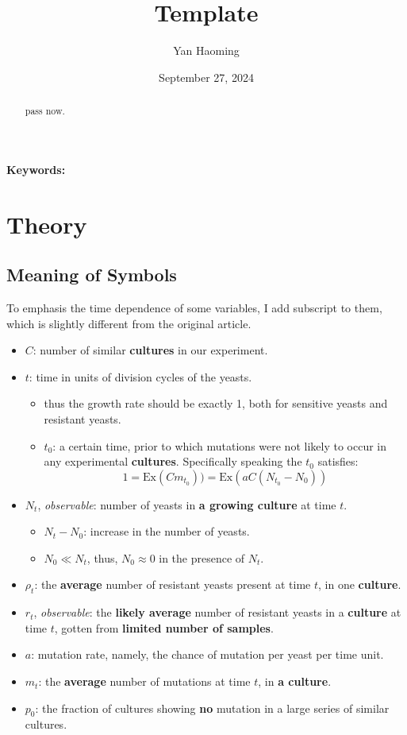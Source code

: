 \documentclass[UTF-8]{article}
\title{Template}
\author{Yan Haoming}
\date{September 27, 2024}
\begin{document}
\maketitle
\begin{abstract}
    pass now.
\end{abstract}
\textbf{Keywords: }
\section{Theory}
\subsection{Meaning of Symbols}
To emphasis the time dependence of some variables, I add subscript to them, which is slightly different from the original article.
\begin{itemize}
    \item $C$: number of similar \textbf{cultures} in our experiment.
    \item $t$: time in units of division cycles of the yeasts.
    \begin{itemize}
        \item thus the growth rate should be exactly 1, both for sensitive yeasts and resistant yeasts.
        \item $t_0$: a certain time, prior to which mutations were not likely to occur in any experimental \textbf{cultures}.
        Specifically speaking the $t_0$ satisfies:
        $$
        1=\text{Ex}(Cm_{t_0}))=\text{Ex}(aC(N_{t_0}-N_0))
        $$
    \end{itemize}
    \item $N_t$, \textit{observable}: number of yeasts in \textbf{a growing culture} at time $t$.
    \begin{itemize}
        \item $N_t-N_0$: increase in the number of yeasts.
        \item $N_0\ll N_t$, thus, $N_0\approx 0$ in the presence of $N_t$.
    \end{itemize}
    \item $\rho _t$: the \textbf{average} number of resistant yeasts present at time $t$, in one \textbf{culture}.
    \item $r_t$, \textit{observable}: the \textbf{likely average} number of resistant yeasts in a \textbf{culture} at time $t$, gotten from \textbf{limited number of samples}.
    \item $a$: mutation rate, namely, the chance of mutation per yeast per time unit.
    \item $m_t$: the \textbf{average} number of mutations at time $t$, in \textbf{a culture}.
    \item $p_0$: the fraction of cultures showing \textbf{no} mutation in a large series of similar cultures.


\end{itemize}
\end{document}
